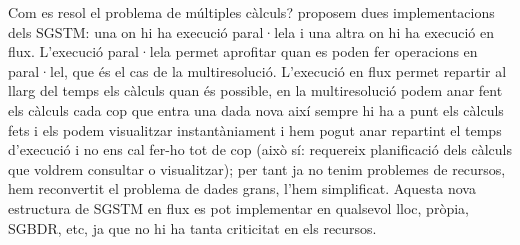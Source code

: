Com es resol el problema de múltiples càlculs? proposem dues
implementacions dels SGSTM: una on hi ha execució paral·lela i una
altra on hi ha execució en flux.  L'execució paral·lela permet
aprofitar quan es poden fer operacions en paral·lel, que és el cas de
la multiresolució. L'execució en flux permet repartir al llarg del
temps els càlculs quan és possible, en la multiresolució podem anar
fent els càlculs cada cop que entra una dada nova així sempre hi ha a
punt els càlculs fets i els podem visualitzar instantàniament i hem
pogut anar repartint el temps d'execució i no ens cal fer-ho tot de
cop (això sí: requereix planificació dels càlculs que voldrem
consultar o visualitzar); per tant ja no tenim problemes de recursos,
hem reconvertit el problema de dades grans, l'hem simplificat.
Aquesta nova estructura de SGSTM en flux es pot implementar en qualsevol lloc, pròpia, SGBDR, etc, ja que no hi ha tanta criticitat en els recursos. 




















